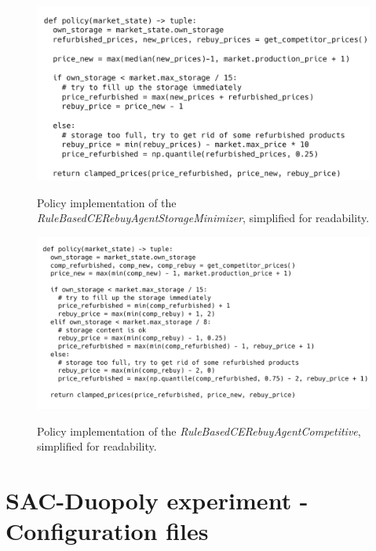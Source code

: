 \begin{figure}[ht]
	\includegraphics[width = \textwidth]{images/policies/RuleBasedCERebuyAgentStorageMinimizerPolicy.png}\\
	\caption{Policy implementation of the \emph{RuleBasedCERebuyAgentStorageMinimizer}, simplified for readability.}\label{fig:PolicyRuleBasedStorageMinimizer}
\end{figure}

\begin{figure}[!]
	\includegraphics[width = \textwidth]{images/policies/RuleBasedCERebuyAgentCompetitivePolicy.png}\\
	\caption{Policy implementation of the \emph{RuleBasedCERebuyAgentCompetitive}, simplified for readability.}\label{fig:PolicyRuleBasedCompetitive}
\end{figure}

\clearpage
\section{SAC-Duopoly experiment - Configuration files}

